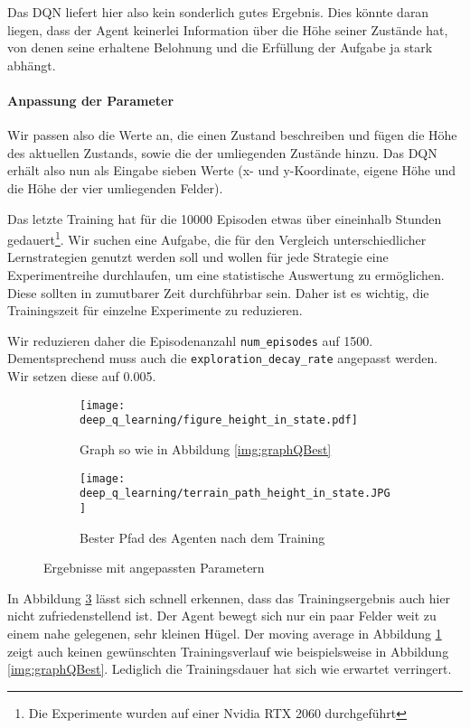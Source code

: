 Das DQN liefert hier also kein sonderlich gutes Ergebnis. Dies könnte daran liegen, dass der Agent keinerlei Information über die Höhe seiner Zustände hat, von denen seine erhaltene Belohnung und die Erfüllung der Aufgabe ja stark abhängt.

\paragraph{Anpassung der Parameter}
Wir passen also die Werte an, die einen Zustand beschreiben und fügen die Höhe des aktuellen Zustands, sowie die der umliegenden Zustände hinzu. Das DQN erhält also nun als Eingabe sieben Werte (x- und y-Koordinate, eigene Höhe und die Höhe der vier umliegenden Felder).

Das letzte Training hat für die 10000 Episoden etwas über eineinhalb Stunden gedauert\footnote{Die Experimente wurden auf einer Nvidia RTX 2060 durchgeführt}. Wir suchen eine Aufgabe, die für den Vergleich unterschiedlicher Lernstrategien genutzt werden soll und wollen für jede Strategie eine Experimentreihe durchlaufen, um eine statistische Auswertung zu ermöglichen. Diese sollten in zumutbarer Zeit durchführbar sein. Daher ist es wichtig, die Trainingszeit für einzelne Experimente zu reduzieren. 

Wir reduzieren daher die Episodenanzahl \texttt{num_episodes} auf 1500. Dementsprechend muss auch die \texttt{exploration_decay_rate} angepasst werden. Wir setzen diese auf 0.005.
\begin{figure}[h!]
    \centering
    \begin{subfigure}[b]{0.49\textwidth}
        \texttt{[image: deep\_q\_learning/figure\_height\_in\_state.pdf]}
        \caption{Graph so wie in Abbildung \ref{img:graphQBest}}
        \label{img:graphDeepQHeightInState}
    \end{subfigure}
    \begin{subfigure}[b]{0.49\textwidth}
        \texttt{[image: deep\_q\_learning/terrain\_path\_height\_in\_state.JPG]}
        \caption{Bester Pfad des Agenten nach dem Training}
        \label{img:pathDeepQHeightInState}
    \end{subfigure}
    \caption{Ergebnisse mit angepassten Parametern}
\end{figure}
In Abbildung \ref{img:pathDeepQHeightInState} lässt sich schnell erkennen, dass das Trainingsergebnis auch hier nicht zufriedenstellend ist. Der Agent bewegt sich nur ein paar Felder weit zu einem nahe gelegenen, sehr kleinen Hügel. Der moving average in Abbildung \ref{img:graphDeepQHeightInState} zeigt auch keinen gewünschten Trainingsverlauf wie beispielsweise in Abbildung \ref{img:graphQBest}. Lediglich die Trainingsdauer hat sich wie erwartet verringert.

